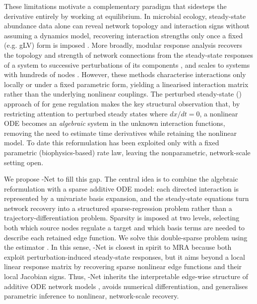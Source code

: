 These limitations motivate a complementary paradigm that sidesteps the derivative
entirely by working at equilibrium. In microbial ecology, steady-state abundance data
alone can reveal network topology and interaction signs without assuming a dynamics
model, recovering interaction strengths only once a fixed (e.g. gLV) form is imposed
\citep{xiao2017mapping}. More broadly, modular response analysis recovers the topology
and strength of network connections from the steady-state responses of a system to
successive perturbations of its components
\citep{kholodenko2002untangling,jimenezdominguez2021aimera}, and scales to systems with
hundreds of nodes \citep{mekedem2022mra}. However, these methods characterise
interactions only locally or under a fixed parametric form, yielding a linearised
interaction matrix rather than the underlying nonlinear couplings. The perturbed
steady-state (\pss{}) approach of \citet{meister2013pss} for
gene regulation makes the key structural observation that, by restricting attention to
perturbed steady states where $dx/dt = 0$, a nonlinear ODE becomes an \emph{algebraic}
system in the unknown interaction functions, removing the need to estimate time
derivatives while retaining the nonlinear model. To date this reformulation has been
exploited only with a fixed parametric (biophysics-based) rate law, leaving the
nonparametric, network-scale setting open.

We propose \pss{}-Net to fill this gap. The central idea is to combine the algebraic
\pss{} reformulation with a sparse additive ODE model: each directed interaction is
represented by a univariate basis expansion, and the steady-state equations turn
network recovery into a structured sparse-regression problem rather than a
trajectory-differentiation problem. Sparsity is imposed at two levels, selecting both
which source nodes regulate a target and which basis terms are needed to describe each
retained edge function. We solve this double-sparse problem using the \adsiht{}
estimator \citep{zhang2023minimax,cai2022sparsegroup}. In this sense, \pss{}-Net is
closest in spirit to MRA because both exploit perturbation-induced steady-state
responses, but it aims beyond a local linear response matrix by recovering sparse
nonlinear edge functions and their local Jacobian signs. Thus, \pss{}-Net inherits the
interpretable edge-wise structure of additive ODE network models
\citep{henderson2014network,wu2014saode,chen2017network}, avoids numerical
differentiation, and
generalises parametric \pss{} inference \citep{meister2013pss} to nonlinear,
network-scale recovery.

